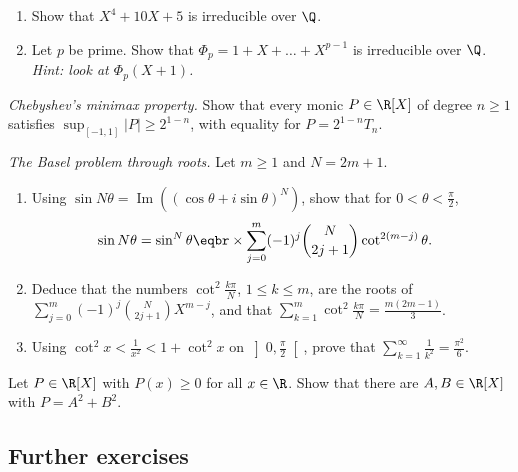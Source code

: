 \begin{exercise}[$\star\star$]\label{ex:eisen}
\begin{enumerate}[label=(\alph*)]
\item Show that $X^4+10X+5$ is irreducible over $\Q$.
\item Let $p$ be prime. Show that $\Phi_p=1+X+\dots+X^{p-1}$ is irreducible over $\Q$. \emph{Hint: look at $\Phi_p(X+1)$.}
\end{enumerate}
\end{exercise}

\begin{exercise}[$\star\star\star$]\label{ex:minimax}
\emph{Chebyshev's minimax property.} Show that every monic $P\in\R[X]$ of degree $n\ge1$ satisfies
$\sup_{[-1,1]}|P|\ge2^{1-n}$, with equality for $P=2^{1-n}T_n$.
\end{exercise}

\begin{exercise}[$\star\star\star$]\label{ex:basel}
\emph{The Basel problem through roots.} Let $m\ge1$ and $N=2m+1$.
\begin{enumerate}[label=(\alph*)]
\item Using $\sin N\theta=\operatorname{Im}\left((\cos\theta+i\sin\theta)^N\right)$, show that for $0<\theta<\frac\pi2$,
\[
\begin{aligned}\sin N\theta&=\sin^N\theta\eqbr\times\sum_{j=0}^m(-1)^j\binom N{2j+1}\cot^{2(m-j)}\theta.\end{aligned}
\]
\item Deduce that the numbers $\cot^2\frac{k\pi}N$, $1\le k\le m$, are the roots of $\sum_{j=0}^m(-1)^j\binom N{2j+1}X^{m-j}$, and that
$\displaystyle\sum_{k=1}^m\cot^2\frac{k\pi}N=\frac{m(2m-1)}3$.
\item Using $\cot^2x<\frac1{x^2}<1+\cot^2x$ on $\left]0,\frac\pi2\right[$, prove that $\displaystyle\sum_{k=1}^\infty\frac1{k^2}=\frac{\pi^2}6$.
\end{enumerate}
\end{exercise}

\begin{exercise}[$\star\star\star$]\label{ex:sos}
Let $P\in\R[X]$ with $P(x)\ge0$ for all $x\in\R$. Show that there are $A,B\in\R[X]$ with $P=A^2+B^2$.
\end{exercise}

\subsection*{Further exercises}

